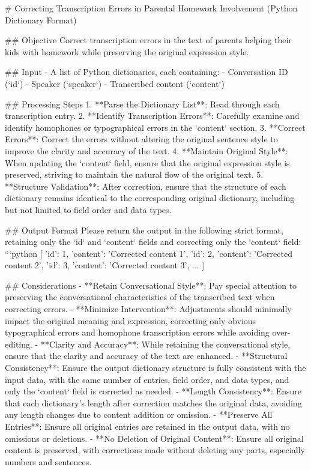 \begingroup
\footnotesize
\begin{spverbatim}
# Correcting Transcription Errors in Parental Homework Involvement (Python Dictionary Format)

## Objective
Correct transcription errors in the text of parents helping their kids with homework while preserving the original expression style.

## Input
- A list of Python dictionaries, each containing:
  - Conversation ID (`id`)
  - Speaker (`speaker`)
  - Transcribed content (`content`)

## Processing Steps
1. **Parse the Dictionary List**: Read through each transcription entry.
2. **Identify Transcription Errors**: Carefully examine and identify homophones or typographical errors in the `content` section.
3. **Correct Errors**: Correct the errors without altering the original sentence style to improve the clarity and accuracy of the text.
4. **Maintain Original Style**: When updating the `content` field, ensure that the original expression style is preserved, striving to maintain the natural flow of the original text.
5. **Structure Validation**: After correction, ensure that the structure of each dictionary remains identical to the corresponding original dictionary, including but not limited to field order and data types.

## Output Format
Please return the output in the following strict format, retaining only the `id` and `content` fields and correcting only the `content` field:
```python
[
    {'id': 1, 'content': 'Corrected content 1'}, 
    {'id': 2, 'content': 'Corrected content 2'}, 
    {'id': 3, 'content': 'Corrected content 3'}, 
    ...
]

## Considerations
- **Retain Conversational Style**: Pay special attention to preserving the conversational characteristics of the transcribed text when correcting errors.
- **Minimize Intervention**: Adjustments should minimally impact the original meaning and expression, correcting only obvious typographical errors and homophone transcription errors while avoiding over-editing.
- **Clarity and Accuracy**: While retaining the conversational style, ensure that the clarity and accuracy of the text are enhanced.
- **Structural Consistency**: Ensure the output dictionary structure is fully consistent with the input data, with the same number of entries, field order, and data types, and only the `content` field is corrected as needed.
- **Length Consistency**: Ensure that each dictionary's length after correction matches the original data, avoiding any length changes due to content addition or omission.
- **Preserve All Entries**: Ensure all original entries are retained in the output data, with no omissions or deletions.
- **No Deletion of Original Content**: Ensure all original content is preserved, with corrections made without deleting any parts, especially numbers and sentences.

\end{spverbatim}
\endgroup

